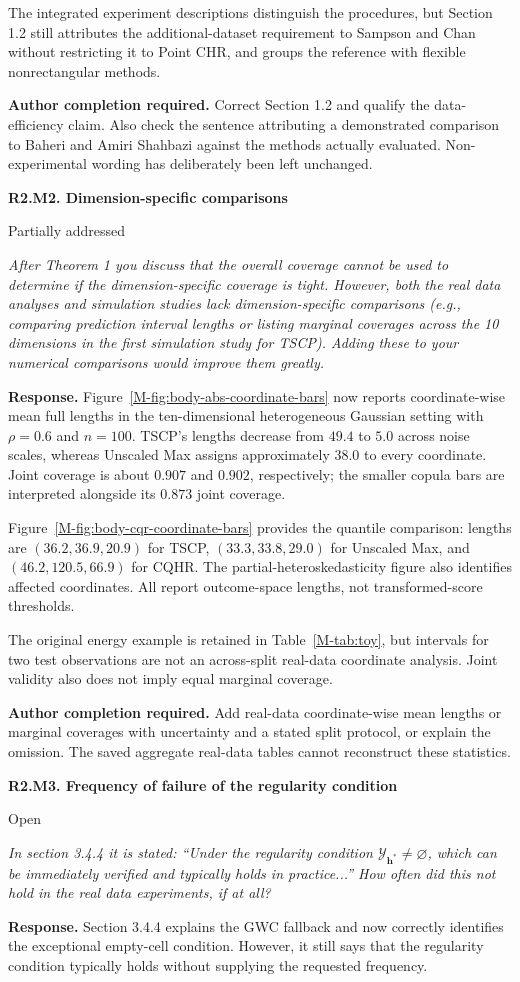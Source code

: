 \documentclass[11pt]{article}
\newcommand{\msfig}[1]{Figure~\ref*{M-#1}}
\newcommand{\mstab}[1]{Table~\ref*{M-#1}}
\newcommand{\action}[1]{\par{\small\color{ActionRed}\textbf{Author completion required.} #1\par}}
\newcommand{\point}[3]{\par\Needspace{7\baselineskip}\medskip
\noindent\parbox[t]{0.77\linewidth}{\textbf{#1}}\hfill
\parbox[t]{0.21\linewidth}{\raggedleft\small\sffamily #2}\par\nopagebreak
{\color{ReviewerBlue}\small\itshape #3\par}\textbf{Response.} }
\begin{document}
The integrated experiment descriptions distinguish the procedures, but Section 1.2 still attributes the additional-dataset requirement to Sampson and Chan without restricting it to Point CHR, and groups the reference with flexible nonrectangular methods.

\action{Correct Section 1.2 and qualify the data-efficiency claim. Also check the sentence attributing a demonstrated comparison to Baheri and Amiri Shahbazi against the methods actually evaluated. Non-experimental wording has deliberately been left unchanged.}

\point{R2.M2. Dimension-specific comparisons}{Partially addressed}{After Theorem 1 you discuss that the overall coverage cannot be used
to determine if the dimension-specific coverage is tight. However,
both the real data analyses and simulation studies lack
dimension-specific comparisons (e.g., comparing prediction interval
lengths or listing marginal coverages across the 10 dimensions in
the first simulation study for TSCP). Adding these to your numerical
comparisons would improve them greatly.}
\label{response:R2.M2}
\msfig{fig:body-abs-coordinate-bars} now reports coordinate-wise mean full lengths in the ten-dimensional heterogeneous Gaussian setting with $\rho=0.6$ and $n=100$. TSCP's lengths decrease from $49.4$ to $5.0$ across noise scales, whereas Unscaled Max assigns approximately $38.0$ to every coordinate. Joint coverage is about $0.907$ and $0.902$, respectively; the smaller copula bars are interpreted alongside its $0.873$ joint coverage.

\msfig{fig:body-cqr-coordinate-bars} provides the quantile comparison: lengths are $(36.2,36.9,20.9)$ for TSCP, $(33.3,33.8,29.0)$ for Unscaled Max, and $(46.2,120.5,66.9)$ for CQHR. The partial-heteroskedasticity figure also identifies affected coordinates. All report outcome-space lengths, not transformed-score thresholds.

The original energy example is retained in \mstab{tab:toy}, but intervals for two test observations are not an across-split real-data coordinate analysis. Joint validity also does not imply equal marginal coverage.

\action{Add real-data coordinate-wise mean lengths or marginal coverages with uncertainty and a stated split protocol, or explain the omission. The saved aggregate real-data tables cannot reconstruct these statistics.}

\point{R2.M3. Frequency of failure of the regularity condition}{Open}{In section 3.4.4 it is stated: ``Under the regularity condition
$\mathcal Y_{\bm h^*}\ne\varnothing$, which can be immediately
verified and typically holds in practice...'' How often did this
not hold in the real data experiments, if at all?}
\label{response:R2.M3}
Section 3.4.4 explains the GWC fallback and now correctly identifies the exceptional empty-cell condition. However, it still says that the regularity condition typically holds without supplying the requested frequency.
\end{document}
